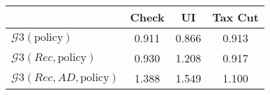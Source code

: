 \begin{tabular}{@{}lccc@{}}
\toprule
                          & Check      & UI    & Tax Cut    \\  \midrule
$\mathcal{G}3(\text{policy})$ & 0.911  & 0.866  & 0.913     \\
$\mathcal{G}3(Rec,\text{policy})$ & 0.930  & 1.208  & 0.917     \\
$\mathcal{G}3(Rec, AD,\text{policy})$ & 1.388  & 1.549  & 1.100     \\
\end{tabular}
